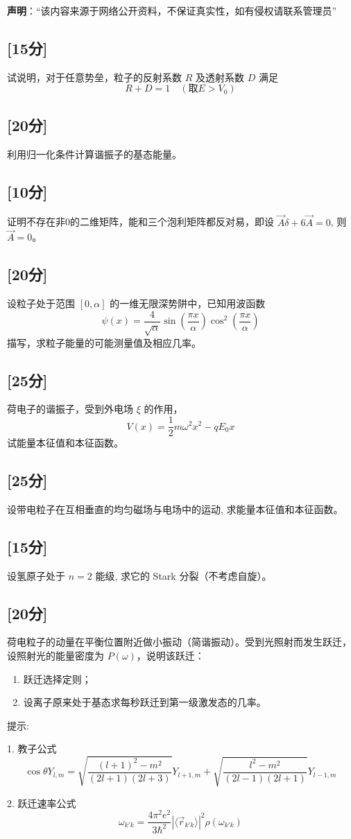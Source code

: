 
\textbf{声明}：“该内容来源于网络公开资料，不保证真实性，如有侵权请联系管理员”

\subsection{[15分]}
试说明，对于任意势垒，粒子的反射系数 $R$ 及透射系数 $D$ 满足
\[    R + D = 1 \quad (\text{取} E > V_0) ~ \]
\subsection{[20分]}
利用归一化条件计算谐振子的基态能量。
\subsection{[10分]}
证明不存在非0的二维矩阵，能和三个泡利矩阵都反对易，即设 $\vec A \delta + 6\vec A = 0$, 则 $\vec{A} = 0$。
\subsection{[20分]}
设粒子处于范围 $[0, \alpha]$ 的一维无限深势阱中，已知用波函数
    \[    \psi(x) = \frac{4}{\sqrt{\alpha}} \sin\left(\frac{\pi x}{\alpha}\right) \cos^2\left(\frac{\pi x}{\alpha}\right) ~ \]
    描写，求粒子能量的可能测量值及相应几率。
\subsection{[25分]}
荷电子的谐振子，受到外电场 $\xi$ 的作用，
    \[    V(x) = \frac{1}{2} m \omega^2 x^2 - q E_0 x  ~\]
 试能量本征值和本征函数。
\subsection{[25分]}
设带电粒子在互相垂直的均匀磁场与电场中的运动, 求能量本征值和本征函数。
\subsection{[15分]}
设氢原子处于 $n=2$ 能级, 求它的 Stark 分裂（不考虑自旋）。
\subsection{[20分]}
荷电粒子的动量在平衡位置附近做小振动（简谐振动）。受到光照射而发生跃迁，设照射光的能量密度为 $P(\omega)$，说明该跃迁：
    \begin{enumerate}
        \item 跃迁选择定则；
        \item 设离子原来处于基态求每秒跃迁到第一级激发态的几率。
    \end{enumerate}

提示:

1. 教子公式 $$\cos\theta Y_{l,m} = \sqrt{\frac{(l+1)^2 - m^2}{(2l+1)(2l+3)}} Y_{l+1,m} + \sqrt{\frac{l^2 - m^2}{(2l-1)(2l+1)}} Y_{l-1,m}~$$

2. 跃迁速率公式 $$\omega_{k'k} = \frac{4 \pi^2 e^2}{3 \hbar^2} \left| \langle \vec r_{k'k} \rangle \right|^2 \rho(\omega_{k'k})~$$